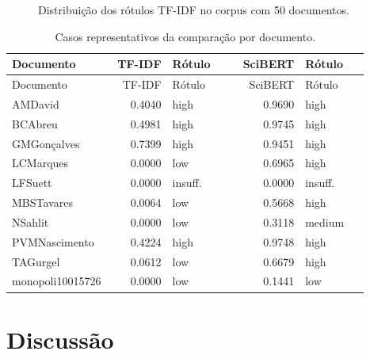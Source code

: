 \documentclass[12pt]{article}
\begin{document}
\begin{figure}[h]
    \centering
    \caption{Distribuição dos rótulos TF-IDF no corpus com 50 documentos.}
    \label{fig:labels}
\end{figure}

\begin{longtable}{p{0.28\linewidth}rp{0.18\linewidth}rp{0.18\linewidth}}
    \caption{Casos representativos da comparação por documento.} \label{tab:comparacao_documento} \\
    \toprule
    Documento & TF-IDF & Rótulo & SciBERT & Rótulo \\
    \midrule
    \endfirsthead
    \toprule
    Documento & TF-IDF & Rótulo & SciBERT & Rótulo \\
    \midrule
    \endhead
    AMDavid & 0.4040 & high & 0.9690 & high \\
    BCAbreu & 0.4981 & high & 0.9745 & high \\
    GMGonçalves & 0.7399 & high & 0.9451 & high \\
    LCMarques & 0.0000 & low & 0.6965 & high \\
    LFSuett & 0.0000 & insuff. & 0.0000 & insuff. \\
    MBSTavares & 0.0064 & low & 0.5668 & high \\
    NSahlit & 0.0000 & low & 0.3118 & medium \\
    PVMNascimento & 0.4224 & high & 0.9748 & high \\
    TAGurgel & 0.0612 & low & 0.6679 & high \\
    monopoli10015726 & 0.0000 & low & 0.1441 & low \\
    \bottomrule
\end{longtable}

\section{Discussão}
\end{document}

